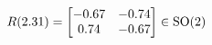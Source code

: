 \documentclass[preview]{standalone}
\begin{document}
\begin{align*}
\special{dvisvgm:raw <g id='unique000'>}R(2.31) = \begin{bmatrix} -0.67 & -0.74 \\ 0.74 & -0.67 \end{bmatrix} \in \text{SO}(2)\special{dvisvgm:raw </g>}
\end{align*}
\end{document}
